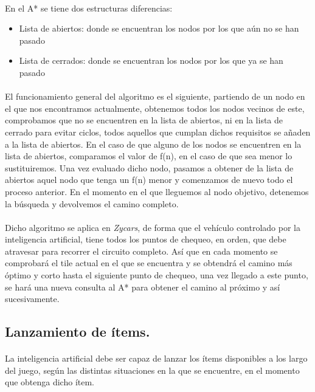 \paragraph{}
En el A* se tiene dos estructuras diferencias:

\begin{itemize}
    \item Lista de abiertos: donde se encuentran los nodos por los que aún no se han pasado
    \item Lista de cerrados: donde se encuentran los nodos por los que ya se han pasado
\end{itemize}

\paragraph{}
El funcionamiento general del algoritmo es el siguiente, partiendo de un nodo en el que nos encontramos actualmente,
obtenemos todos los nodos vecinos de este, comprobamos que no se encuentren en la lista de abiertos, ni en la lista
de cerrado para evitar ciclos, todos aquellos que cumplan dichos requisitos se añaden a la lista de abiertos. En el caso de que 
alguno de los nodos se encuentren en la lista de abiertos, comparamos el valor de f(n), en el caso de que sea menor lo 
sustituiremos. Una vez evaluado dicho nodo, pasamos a obtener de la lista de abiertos aquel nodo que tenga un f(n) menor y 
comenzamos de nuevo todo el proceso anterior. En el momento en el que lleguemos al nodo objetivo, detenemos la búsqueda y devolvemos
el camino completo.

\paragraph{}
Dicho algoritmo se aplica en \emph{Zycars}, de forma que el vehículo controlado por la inteligencia artificial, tiene todos los
puntos de chequeo, en orden, que debe atravesar para recorrer el circuito completo. Así que en cada momento se comprobará
el tile actual en el que se encuentra y se obtendrá el camino más óptimo y corto hasta el siguiente punto de chequeo, una vez
llegado a este punto, se hará una nueva consulta al A* para obtener el camino al próximo y así sucesivamente.

\subsection{Lanzamiento de ítems.}

\paragraph{}
La inteligencia artificial debe ser capaz de lanzar los ítems disponibles a los largo del juego, según las distintas 
situaciones en la que se encuentre, en el momento que obtenga dicho ítem.

